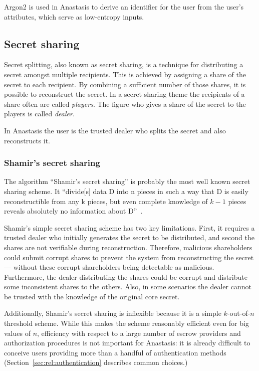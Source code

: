 Argon2 is used in Anastasis to derive an identifier for the user from
the user's attributes, which serve as low-entropy inputs.


\subsection{Secret sharing}

Secret splitting, also known as secret sharing, is a technique for
distributing a secret amongst multiple recipients. This is achieved by
assigning a share of the secret to each recipient. By combining a
sufficient number of those shares, it is possible to reconstruct the
secret.  In a secret sharing theme the recipients of a share often are
called \textit{players}. The figure who gives a share of the secret to
the players is called \textit{dealer}.

In Anastasis the user is the trusted dealer who splits the secret and
also reconstructs it.

\subsubsection{Shamir's secret sharing} \label{sec:rel:shamir}

The algorithm ``Shamir's secret sharing'' is probably the most well
known secret sharing scheme. It ``divide[s] data D into n pieces in
such a way that D is easily reconstructible from any k pieces, but
even complete knowledge of $k - 1$ pieces reveals absolutely no
information about D''~\cite{shamir_sharing}.

Shamir’s simple secret sharing scheme has two key limitations. First,
it requires a trusted dealer who initially generates the secret to be
distributed, and second the shares are not verifiable during
reconstruction. Therefore, malicious shareholders could submit corrupt
shares to prevent the system from reconstructing the secret --- without
these corrupt shareholders being detectable as malicious. Furthermore,
the dealer distributing the shares could be corrupt and distribute
some inconsistent shares to the others. Also, in some scenarios the
dealer cannot be trusted with the knowledge of the original core
secret.

Additionally, Shamir's secret sharing is inflexible because it is a
simple $k$-out-of-$n$ threshold scheme.  While this makes the scheme
reasonably efficient even for big values of $n$, efficiency with
respect to a large number of escrow providers and authorization
procedures is not important for Anastasis: it is already difficult to
conceive users providing more than a handful of authentication methods
(Section~\ref{sec:rel:authentication} describes common choices.)

